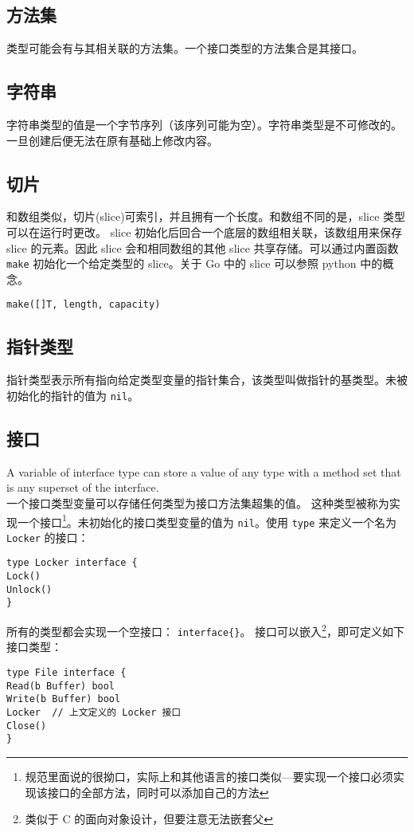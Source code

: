 \subsection{方法集}
类型可能会有与其相关联的方法集。一个接口类型的方法集合是其接口。
\subsection{字符串}
字符串类型的值是一个字节序列（该序列可能为空）。字符串类型是不可修改的。一旦创建后便无法在原有基础上修改内容。
\subsection{切片}
和数组类似，切片(slice)可索引，并且拥有一个长度。和数组不同的是，slice 类型可以在运行时更改。
slice 初始化后回合一个底层的数组相关联，该数组用来保存 slice 的元素。因此 slice 会和相同数组的其他 slice 共享存储。可以通过内置函数 \lstinline|make| 初始化一个给定类型的 slice。关于 Go 中的 slice 可以参照 python 中的概念。
\begin{lstlisting}[language=golang, frame=lb]
make([]T, length, capacity)
\end{lstlisting}

\subsection{指针类型}
指针类型表示所有指向给定类型变量的指针集合，该类型叫做指针的基类型。未被初始化的指针的值为 \verb|nil|。

\subsection{接口}
A variable of interface type can store a value of any type with a method set that is any superset of the interface.\\
一个接口类型变量可以存储任何类型为接口方法集超集的值。
这种类型被称为实现一个接口\footnote{规范里面说的很拗口，实际上和其他语言的接口类似---要实现一个接口必须实现该接口的全部方法，同时可以添加自己的方法}。未初始化的接口类型变量的值为 \lstinline|nil|。使用 \lstinline|type| 来定义一个名为  \verb|Locker| 的接口：
\begin{lstlisting}[language=golang, frame=single]
type Locker interface {
Lock()
Unlock()
}
\end{lstlisting}

所有的类型都会实现一个空接口： \lstinline|interface{}|。
接口可以嵌入\footnote{类似于 C 的面向对象设计，但要注意无法嵌套父}，即可定义如下接口类型：
\begin{lstlisting}[frame=single]
type File interface {
Read(b Buffer) bool
Write(b Buffer) bool
Locker	// 上文定义的 Locker 接口
Close()
}
\end{lstlisting}

